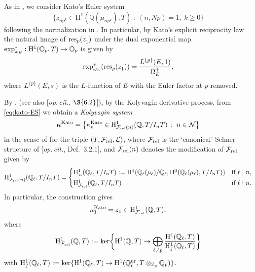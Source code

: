 \documentclass[10pt,reqno]{amsart}
\numberwithin{equation}{section}
\theoremstyle{plain}
\theoremstyle{definition}
\theoremstyle{definition}
\theoremstyle{plain}
\theoremstyle{plain}
\theoremstyle{plain}
\theoremstyle{plain}
\theoremstyle{plain}
\theoremstyle{plain}
\newcommand{\Z}{\mathbb{Z}}
\newcommand{\Q}{\mathbb{Q}}
\newcommand{\Fcal}{\mathcal{F}}
\newcommand{\rH}{\mathrm{H}}
\begin{document}
As in \cite[\S{2.3}]{kim}, we consider Kato's Euler system 
\begin{equation}\label{eq:kato-ES}
\big\{ z_{np^k}^{}\in\rH^1(\Q(\mu_{np^k}),T)\;\colon\;(n,Np)=1,\;k\geq 0\big\}
\end{equation}
following the normalization in \cite[Thm.~6.1]{kataoka}. In particular, by Kato's explicit reciprocity law \cite{kato-euler-systems} the natural image of ${\rm res}_p(z_1^{})$ under the dual exponential map
${\rm exp}_{\omega_E}^*:\rH^1(\Q_p,T)\rightarrow\Q_p$ is given by 
\begin{equation}\label{eq:kato-ERL}
{\rm exp}^*_{\omega_E}({\rm res}_p(z_1^{}))=\frac{L^{\{p\}}(E,1)}{\Omega_E^+},
\end{equation}
where $L^{\{p\}}(E,s)$ is the $L$-function of $E$ with the Euler factor at $p$ removed.

By \cite[Thm.~3.2.4 and $\S{6.2}$]{mazrub}, 
(see also [\emph{op.\,cit.}, $\S{6.2}$]), by the Kolyvagin derivative process, from \eqref{eq:kato-ES} we obtain a \emph{Kolyvagin system}
\[
\boldsymbol{\kappa}^{\rm Kato}=\big\{\kappa_n^{\rm Kato}\in\rH^1_{\Fcal_{\rm rel}(n)}(\Q,T/I_nT)\;\colon\;n\in\mathcal{N}\big\}
\]
in the sense of \cite[\S{3.1}]{mazrub} for the triple $(T,\mathcal{F}_{\rm rel},\mathcal{L})$, where $\Fcal_{\rm rel}$ is the `canonical' Selmer structure of [\emph{op.\,cit.}, Def.~3.2.1], 
and $\mathcal{F}_{\rm rel}(n)$ denotes the modification of $\mathcal{F}_{\rm rel}$ given by
\begin{equation}\label{eq:F(n)}
\rH^1_{\Fcal_{\rm rel}(n)}(\Q_\ell,T/I_nT)=
\begin{cases}
\rH^1_{\rm tr}(\Q_\ell,T/I_nT):=\rH^1(\Q_\ell(\mu_\ell)/\Q_\ell,\rH^0(\Q_\ell(\mu_\ell),T/I_nT))&\textrm{if $\ell\mid n$,}\\[0.2em]
\rH^1_{\Fcal_{\rm rel}}(\Q_\ell,T/I_nT)&\textrm{if $\ell\nmid n$.}
\end{cases}
\end{equation}
In particular, the construction gives 
\[
\kappa_1^{\rm Kato}=z_1\in\rH^1_{\Fcal_{\rm rel}}(\Q,T),
\]
where
\[
\rH^1_{\Fcal_{\rm rel}}(\Q,T):={\rm ker}\biggl\{\rH^1(\Q,T)\rightarrow\bigoplus_{\ell\neq p}\frac{\rH^1(\Q_\ell,T)}{\rH^1_f(\Q_\ell,T)}\biggr\}
\]
with $\rH^1_f(\Q_\ell,T):={\rm ker}\{\rH^1(\Q_\ell,T)\rightarrow\rH^1(\Q_\ell^{\rm ur},T\otimes_{\Z_p}\Q_p)\}$.
\end{document}
